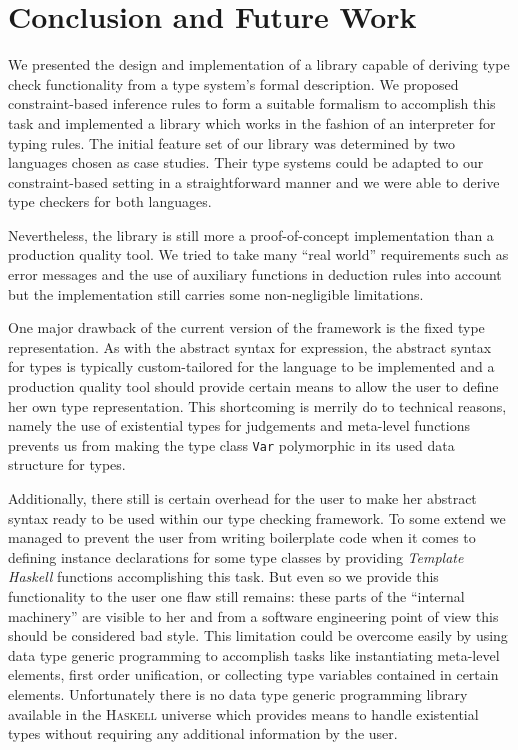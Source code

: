 \section{Conclusion and Future Work}

We presented the design and implementation of a library capable of
deriving type check functionality from a type system's formal
description. We proposed constraint-based inference rules to form a
suitable formalism to accomplish this task and implemented a library
which works in the fashion of an interpreter for typing rules. The
initial feature set of our library was determined by two languages
chosen as case studies. Their type systems could be adapted to our
constraint-based setting in a straightforward manner and we were able
to derive type checkers for both languages.

Nevertheless, the library is still more a proof-of-concept
implementation than a production quality tool. We tried to take many
``real world'' requirements such as error messages and the use of
auxiliary functions in deduction rules into account but the
implementation still carries some non-negligible limitations.

One major drawback of the current version of the framework is the
fixed type representation. As with the abstract syntax for expression,
the abstract syntax for types is typically custom-tailored for the
language to be implemented and a production quality tool should
provide certain means to allow the user to define her own type
representation. This shortcoming is merrily do to technical reasons,
namely the use of existential types for judgements and meta-level
functions prevents us from making the type class \texttt{Var}
polymorphic in its used data structure for types.

Additionally, there still is certain overhead for the user to make her
abstract syntax ready to be used within our type checking
framework. To some extend we managed to prevent the user from writing
boilerplate code when it comes to defining instance declarations for
some type classes by providing \textit{Template Haskell} functions
accomplishing this task. But even so we provide this functionality to
the user one flaw still remains: these parts of the ``internal
machinery'' are visible to her and from a software engineering point
of view this should be considered bad style. This limitation could be
overcome easily by using data type generic programming to accomplish
tasks like instantiating meta-level elements, first order unification,
or collecting type variables contained in certain
elements. Unfortunately there is no data type generic programming
library available in the \textsc{Haskell} universe which provides
means to handle existential types without requiring any additional
information by the user.

